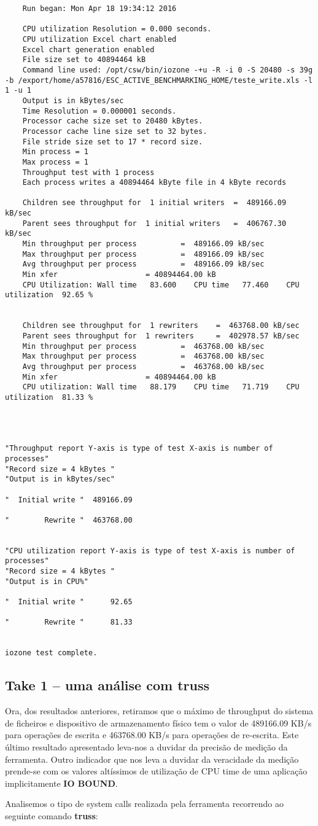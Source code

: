 \documentclass[a4paper]{article}
\begin{document}
{\begin{lstlisting}
	Run began: Mon Apr 18 19:34:12 2016

	CPU utilization Resolution = 0.000 seconds.
	CPU utilization Excel chart enabled
	Excel chart generation enabled
	File size set to 40894464 kB
	Command line used: /opt/csw/bin/iozone -+u -R -i 0 -S 20480 -s 39g -b /export/home/a57816/ESC_ACTIVE_BENCHMARKING_HOME/teste_write.xls -l 1 -u 1
	Output is in kBytes/sec
	Time Resolution = 0.000001 seconds.
	Processor cache size set to 20480 kBytes.
	Processor cache line size set to 32 bytes.
	File stride size set to 17 * record size.
	Min process = 1 
	Max process = 1 
	Throughput test with 1 process
	Each process writes a 40894464 kByte file in 4 kByte records

	Children see throughput for  1 initial writers 	=  489166.09 kB/sec
	Parent sees throughput for  1 initial writers 	=  406767.30 kB/sec
	Min throughput per process 			=  489166.09 kB/sec 
	Max throughput per process 			=  489166.09 kB/sec
	Avg throughput per process 			=  489166.09 kB/sec
	Min xfer 					= 40894464.00 kB
	CPU Utilization: Wall time   83.600    CPU time   77.460    CPU utilization  92.65 %


	Children see throughput for  1 rewriters 	=  463768.00 kB/sec
	Parent sees throughput for  1 rewriters 	=  402978.57 kB/sec
	Min throughput per process 			=  463768.00 kB/sec 
	Max throughput per process 			=  463768.00 kB/sec
	Avg throughput per process 			=  463768.00 kB/sec
	Min xfer 					= 40894464.00 kB
	CPU utilization: Wall time   88.179    CPU time   71.719    CPU utilization  81.33 %




"Throughput report Y-axis is type of test X-axis is number of processes"
"Record size = 4 kBytes "
"Output is in kBytes/sec"

"  Initial write "  489166.09 

"        Rewrite "  463768.00 


"CPU utilization report Y-axis is type of test X-axis is number of processes"
"Record size = 4 kBytes "
"Output is in CPU%"

"  Initial write "      92.65 

"        Rewrite "      81.33 


iozone test complete.
\end{lstlisting}
 
 \subsection{Take 1 -- uma análise com truss}
Ora, dos resultados anteriores, retiramos que o máximo de throughput do sistema de ficheiros e dispositivo de armazenamento físico tem o valor de 489166.09 KB/s para operações de escrita e 463768.00 KB/s para operações de re-escrita. Este último resultado apresentado leva-nos a duvidar da precisão de medição da ferramenta. Outro indicador que nos leva a duvidar da veracidade da medição prende-se com os valores altíssimos de utilização de CPU time de uma aplicação implicitamente \textbf{IO BOUND}.\par 
Analisemos o tipo de system calls realizada pela ferramenta recorrendo ao seguinte comando \textbf{truss}:

}
\end{document}

